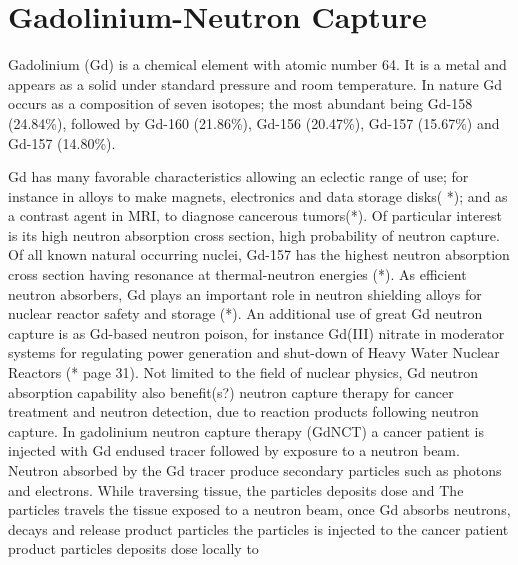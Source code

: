 \chapter{Gadolinium-Neutron Capture}


Gadolinium (Gd) is a chemical element with atomic number 64. It is a metal and appears as a solid under standard pressure and room temperature. In nature Gd occurs as a composition of seven isotopes; the most abundant being Gd-158 (24.84\%), followed by Gd-160 (21.86\%), Gd-156 (20.47\%), Gd-157 (15.67\%) and Gd-157 (14.80\%).

Gd has many favorable characteristics allowing an eclectic range of use; for instance in alloys to make magnets, electronics and data storage disks( *); and as a contrast agent in MRI, to diagnose cancerous tumors(*).
Of particular interest is its high neutron absorption cross section, high probability of neutron capture. Of all known natural occurring nuclei, Gd-157 has the highest neutron absorption cross section having resonance at thermal-neutron energies (*). As efficient neutron absorbers, Gd plays an important role in neutron shielding alloys for nuclear reactor safety and storage (*). An additional use of great Gd neutron capture is as Gd-based neutron poison, for instance Gd(III) nitrate in moderator systems for regulating power generation and shut-down of Heavy Water Nuclear Reactors (* page 31).
Not limited to the field of nuclear physics, Gd neutron absorption capability also benefit(s?) neutron capture therapy for cancer treatment and neutron detection, due to reaction products following neutron capture.  In gadolinium neutron capture therapy (GdNCT) a cancer patient is injected with Gd endused tracer followed by exposure to a neutron beam. Neutron absorbed by the Gd tracer produce secondary particles such as photons and electrons. While traversing tissue, the particles deposits dose and The particles travels the tissue exposed to a neutron beam, once Gd absorbs neutrons, decays and release product particles the particles  is injected to the cancer patient product particles deposits dose locally to


